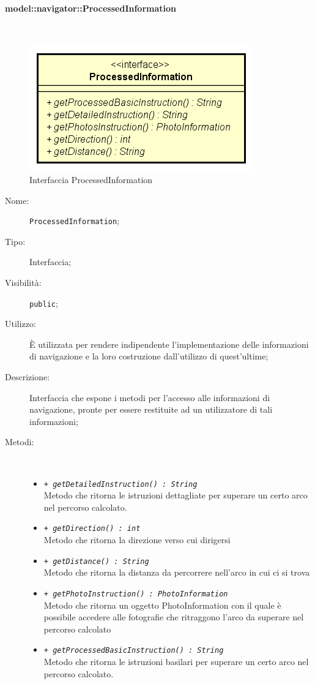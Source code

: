 \documentclass[../DefinizioneDiProdotto.tex]{subfiles}
\begin{document}
\paragraph{model::navigator::ProcessedInformation}
\
\begin{figure}[H]
	\centering
	\includegraphics[width=\maxwidth]{img/ProcessedInformation.png}
	\caption{Interfaccia ProcessedInformation}\label{fig:model::navigator::ProcessedInformation} 
\end{figure}
\begin{description}
	\item[Nome:] \texttt{ProcessedInformation};
	\item[Tipo:] Interfaccia;
	\item[Visibilità:] \texttt{public};
	\item[Utilizzo:] È utilizzata per rendere indipendente l'implementazione delle informazioni di navigazione e la loro costruzione dall'utilizzo di quest'ultime;
	\item[Descrizione:] Interfaccia che espone i metodi per l'accesso alle informazioni di navigazione, pronte per essere restituite ad un utilizzatore di tali informazioni;
	\item[Metodi:] \
	\begin{itemize}
		\item \texttt{+ \textit{getDetailedInstruction() : String}}\\
		Metodo che ritorna le istruzioni dettagliate per superare un certo arco nel percorso calcolato.
		\item \texttt{+ \textit{getDirection() : int}}\\
		Metodo che ritorna la direzione verso cui dirigersi
		\item \texttt{+ \textit{getDistance() : String}}\\
		Metodo che ritorna la distanza da percorrere nell'arco in cui ci si trova
		\item \texttt{+ \textit{getPhotoInstruction() : PhotoInformation}}\\
		Metodo che ritorna un oggetto PhotoInformation con il quale è possibile accedere alle fotografie che ritraggono l'arco da superare nel percorso calcolato
		\item \texttt{+ \textit{getProcessedBasicInstruction() : String}}\\
		Metodo che ritorna le istruzioni basilari per superare un certo arco nel percorso calcolato.
	\end{itemize}
\end{description}
\end{document}

